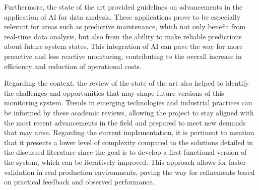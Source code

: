 Furthermore, the state of the art provided guidelines on advancements in the application of \gls{AI} for data analysis. These applications prove to be especially relevant for areas such as predictive maintenance, which not only benefit from real-time data analysis, but also from the ability to make reliable predictions about future system states. This integration of AI can pave the way for more proactive and less reactive monitoring, contributing to the overall increase in efficiency and reduction of operational costs.

Regarding the context, the review of the state of the art also helped to identify the challenges and opportunities that may shape future versions of this monitoring system. Trends in emerging technologies and industrial practices can be informed by these academic reviews, allowing the project to stay aligned with the most recent advancements in the field and prepared to meet new demands that may arise.
Regarding the current implementation, it is pertinent to mention that it presents a lower level of complexity compared to the solutions detailed in the discussed literature since the goal is to develop a first functional version of the system, which can be iteratively improved. This approach allows for faster validation in real production environments, paving the way for refinements based on practical feedback and observed performance.
